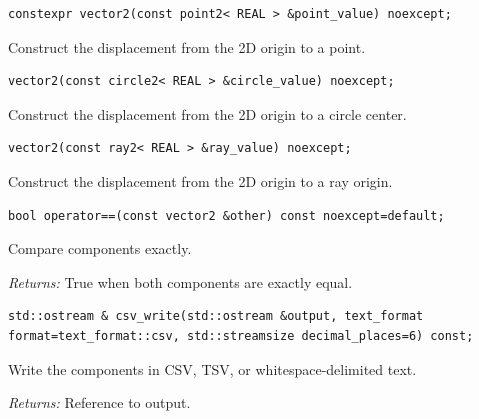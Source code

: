 \par\noindent\begin{minipage}{\linewidth}
\begin{lstlisting}[style=apireference]
constexpr vector2(const point2< REAL > &point_value) noexcept;
\end{lstlisting}
{\footnotesize Construct the displacement from the 2D origin to a point.\par}
\end{minipage}\par\vspace{1pt}
\par\noindent\begin{minipage}{\linewidth}
\begin{lstlisting}[style=apireference]
vector2(const circle2< REAL > &circle_value) noexcept;
\end{lstlisting}
{\footnotesize Construct the displacement from the 2D origin to a circle center.\par}
\end{minipage}\par\vspace{1pt}
\par\noindent\begin{minipage}{\linewidth}
\begin{lstlisting}[style=apireference]
vector2(const ray2< REAL > &ray_value) noexcept;
\end{lstlisting}
{\footnotesize Construct the displacement from the 2D origin to a ray origin.\par}
\end{minipage}\par\vspace{1pt}
\par\noindent\begin{minipage}{\linewidth}
\begin{lstlisting}[style=apireference]
bool operator==(const vector2 &other) const noexcept=default;
\end{lstlisting}
{\footnotesize Compare components exactly.\par}
{\footnotesize\textit{Returns:} True when both components are exactly equal.\par}
\end{minipage}\par\vspace{1pt}
\par\noindent\begin{minipage}{\linewidth}
\begin{lstlisting}[style=apireference]
std::ostream & csv_write(std::ostream &output, text_format format=text_format::csv, std::streamsize decimal_places=6) const;
\end{lstlisting}
{\footnotesize Write the components in CSV, TSV, or whitespace-delimited text.\par}
{\footnotesize\textit{Returns:} Reference to output.\par}
\end{minipage}\par\vspace{1pt}
